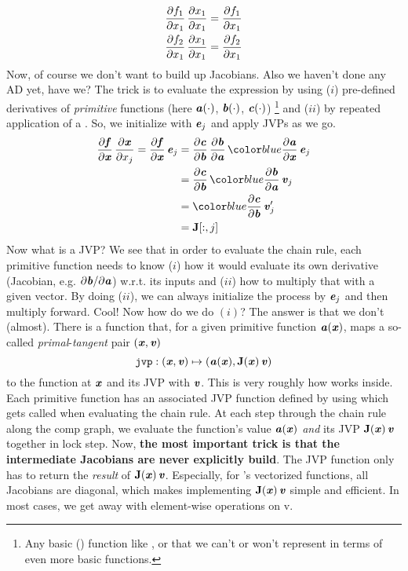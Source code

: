 \documentclass[paper=a4,11pt,headsepline]{scrartcl}
\begin{document}
\begin{gather*}
    \dfrac{\partial f_1}{\partial x_1}\,\dfrac{\partial x_1}{\partial x_1} = \dfrac{\partial f_1}{\partial x_1} \\
    \dfrac{\partial f_2}{\partial x_1}\,\dfrac{\partial x_1}{\partial x_1} = \dfrac{\partial f_2}{\partial x_1} \\
\end{gather*}
Now, of course we don't want to build up Jacobians. Also we haven't done any AD
yet, have we? The trick is to evaluate the expression by using ($i$)
pre-defined derivatives of \emph{primitive} functions (here $\bm{\mathit{a}}(\cdot)$,
$\bm{\mathit{b}}(\cdot)$, $\bm{\mathit{c}}(\cdot)$)%
\footnote{Any basic (\numpy) function like , 
or  that we can't or won't represent in terms of even more basic
functions.}
and ($ii$) by repeated application of a
. So, we initialize with $\bm{\mathit{e}}_j$
and apply JVPs as we go.
\begin{align*}
    \pd{\ve f}{\ve x}\,\pd{\ve x}{x_j} = \pd{\ve f}{\ve x}\,\ve e_j
        &= \pd{\ve c}{\ve b}\,\pd{\ve b}{\ve a}\,\blue{\pd{\ve a}{\ve x}\,\ve e_j} \\
        &= \pd{\ve c}{\ve b}\,\blue{\pd{\ve b}{\ve a}\,\ve v_j} \\
        &= \blue{\pd{\ve c}{\ve b}\,\ve v_j'} \\
        &= \ma J[:,j]
\end{align*}
Now what is a JVP? We see that in order to evaluate the chain rule, each
primitive function
needs to know ($i$) how it would evaluate its own derivative (Jacobian, e.g.
$\partial \bm{\mathit{b}}/\partial \bm{\mathit{a}}$) w.r.t. its inputs and ($ii$) how to multiply that with a
given vector. By doing ($ii$), we can always initialize the process by $\bm{\mathit{e}}_j$ and then multiply forward. Cool! Now how do we do $(i)$? The answer is
that we don't (almost). There is a function  that, for a given
primitive function $\bm{\mathit{a}}(\bm{\mathit{x}})$, maps a so-called
\emph{primal}-\emph{tangent} pair $(\bm{\mathit{x}}, \bm{\mathit{v}})$
\begin{equation*}
    \texttt{jvp}: (\bm{\mathit{x}}, \bm{\mathit{v}}) \mapsto \left(\bm{\mathit{a}}(\bm{\mathit{x}}), \bm{\mathbf{J}}(\bm{\mathit{x}})\,\bm{\mathit{v}}\right)
\end{equation*}
to the function at $\bm{\mathit{x}}$ and its JVP with $\bm{\mathit{v}}$. This is very roughly how
\jax works inside. Each primitive function has an associated
JVP function defined by using  which gets called when evaluating
the chain rule.
At each step through the chain rule along the comp graph, we evaluate the
function's value $\bm{\mathit{a}}(\bm{\mathit{x}})$ \emph{and} its JVP $\bm{\mathbf{J}}(\bm{\mathit{x}})\,\bm{\mathit{v}}$
together in lock step.
Now, \textbf{the most important trick is that the intermediate
Jacobians are never explicitly build}. The JVP function only has to return the
\emph{result} of $\bm{\mathbf{J}}(\bm{\mathit{x}})\,\bm{\mathit{v}}$. Especially, for \numpy's vectorized
functions, all Jacobians are diagonal, which makes implementing $\bm{\mathbf{J}}(\bm{\mathit{x}})\,\bm{\mathit{v}}$
simple and efficient. In most cases, we get away with element-wise operations
on \ve v.
\end{document}
